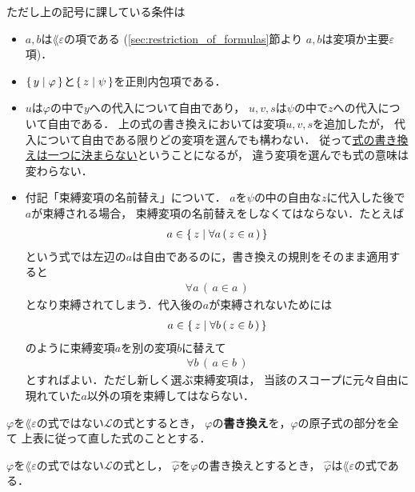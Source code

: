 	ただし上の記号に課している条件は
	\begin{itemize}
		\item $a,b$は$\lang{\varepsilon}$の項である
			(\ref{sec:restriction_of_formulas}節より
			$a,b$は変項か主要$\varepsilon$項)．
		
		\item $\{\, y \mid \varphi\, \}$と$\{\, z \mid \psi\, \}$を正則内包項である．
		
		\item $u$は$\varphi$の中で$y$への代入について自由であり，
			$u,v,s$は$\psi$の中で$z$への代入について自由である．
			上の式の書き換えにおいては変項$u,v,s$を追加したが，
			代入について自由である限りどの変項を選んでも構わない．
			従って\underline{式の書き換えは一つに決まらない}ということになるが，
			違う変項を選んでも式の意味は変わらない．
			
		\item 付記「束縛変項の名前替え」について．
			$a$を$\psi$の中の自由な$z$に代入した後で$a$が束縛される場合，
			束縛変項の名前替えをしなくてはならない．たとえば
			\begin{align}
				a \in \{\, z \mid \forall a\, (\, z \in a\, )\, \}
			\end{align}
			という式では左辺の$a$は自由であるのに，書き換えの規則をそのまま適用すると
			\begin{align}
				\forall a\, (\, a \in a\, )
			\end{align}
			となり束縛されてしまう．代入後の$a$が束縛されないためには
			\begin{align}
				a \in \{\, z \mid \forall b\, (\, z \in b\, )\, \}
			\end{align}
			のように束縛変項$a$を別の変項$b$に替えて
			\begin{align}
				\forall b\, (\, a \in b\, )
			\end{align}
			とすればよい．ただし新しく選ぶ束縛変項は，
			当該のスコープに元々自由に現れていた$a$以外の項を束縛してはならない．
	\end{itemize}
	
	\begin{screen}
		\begin{metadfn}[式の書き換え]
			$\varphi$を$\lang{\varepsilon}$の式ではない$\mathcal{L}$の式とするとき，
			$\varphi$の{\bf 書き換え}を，$\varphi$の原子式の部分を全て
			上表に従って直した式のこととする．
		\end{metadfn}
	\end{screen}
	
	\begin{screen}
		\begin{metathm}
		\label{metathm:rewritten_formulas_are_of_L_epsilon}
			$\varphi$を$\lang{\varepsilon}$の式ではない$\mathcal{L}$の式とし，
			$\widehat{\varphi}$を$\varphi$の書き換えとするとき，
			$\widehat{\varphi}$は$\lang{\varepsilon}$の式である．
		\end{metathm}
	\end{screen}
	
